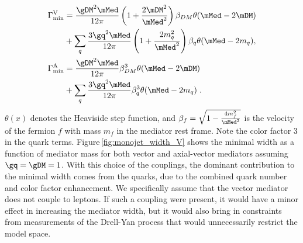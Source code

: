 \begin{align}
\label{eq:monojet_min}
\Gamma^{\textrm{V}}_\textrm{min} &= 
\frac{\gDM^2 \mMed}{12\pi}\left(1+\frac{2 \mDM^2}{\mMed^2} \right)\beta_{DM} \theta(\mMed-2\mDM)\\\nonumber
 &+ \sum_q \frac{3 \gq^2 \mMed}{12\pi}\left(1+\frac{2 m_q^2}{\mMed^2} \right)\beta_q \theta(\mMed-2m_q),\\
\Gamma_{\textrm{min}}^{\rm{A}}&=\frac{\gDM^2 \mMed}{12\pi} \beta_{DM}^{3} \theta(\mMed-2\mDM)\\\nonumber
   &+ \sum_q \frac{3 \gq^2 \mMed}{12\pi}\beta_q^{3} \theta(\mMed-2m_q)\;.
\end{align}
$\theta(x)$ denotes the Heaviside step function, and
$\beta_f=\sqrt{1-\frac{4 m_f^2}{\mMed^2}}$ is the velocity of the
fermion $f$ with mass $m_f$  in the mediator rest frame.
Note the color factor 3 in the quark terms.
Figure\,\ref{fig:monojet_width_V} shows the minimal width as a function of mediator mass for both vector and axial-vector mediators assuming
$\gq=\gDM=1$. With this choice of the couplings, the dominant contribution to the minimal width comes from the quarks, due 
to the combined quark number and color factor enhancement. %
We specifically assume that the vector mediator does not couple to leptons.  If such a coupling were present, it would have a minor effect in increasing the mediator width, but it would also bring in constraints from measurements of the Drell-Yan process that would unnecessarily restrict the model space.

